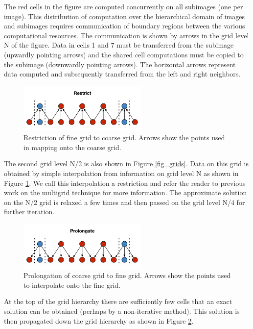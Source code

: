 The red cells in the figure are computed concurrently on all subimages (one per image).
This distribution of computation over the hierarchical domain of images and subimages
requires communication of boundary regions between the various computational resources.
The communication is shown by arrows in the grid level N of the figure.  Data in cells 1
and 7 must be transferred from the subimage (upwardly pointing arrows) and the shared cell
computations must be copied to the subimage (downwardly pointing arrows). The horizontal
arrows represent data computed and subsequently transferred from the left and right
neighbors.

\begin{figure}[!t]
\centering
\includegraphics[width=2.5in]{Fig2}
\caption{Restriction of fine grid to coarse grid. Arrows show the points used in
         mapping onto the coarse grid.}
\label{fig_restric}
\end{figure}

The second grid level N/2 is also shown in Figure \ref{fig_grids}.  Data on this grid is obtained
by simple interpolation from information on grid level N as shown in Figure \ref{fig_restric}.
We call this interpolation a restriction and refer the reader to previous work on the multigrid
technique for more information\cite{multigrid_methods}.  The approximate solution on the N/2
grid is relaxed a few times and then passed on the grid level N/4 for further iteration.

\begin{figure}[!t]
\centering
\includegraphics[width=2.5in]{Fig3}
\caption{Prolongation of coarse grid to fine grid. Arrows show the points used to
         interpolate onto the fine grid.}
\label{fig_prolongate}
\end{figure}

At the top of the grid hierarchy there are sufficiently few cells that an exact solution can be
obtained (perhaps by a non-iterative method).  This solution is then propagated down the
grid hierarchy as shown in Figure \ref{fig_prolongate}.


